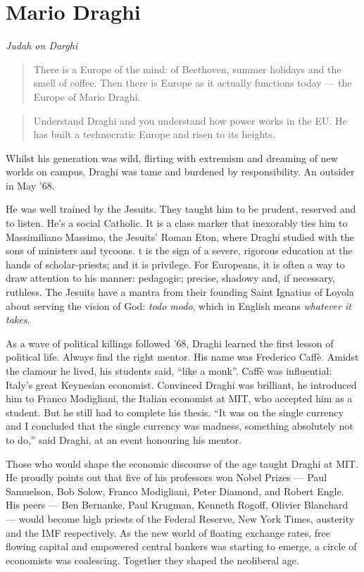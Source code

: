 \documentclass[
]{book}
\begin{document}
\hypertarget{mario-draghi}{%
\section{Mario Draghi}\label{mario-draghi}}

\emph{Judah on Darghi}

\begin{quote}
There is a Europe of the mind: of Beethoven, summer holidays and the smell of coffee.
Then there is Europe as it actually functions today --- the Europe of Mario Draghi.
\end{quote}

\begin{quote}
Understand Draghi and you understand how power works in the EU. He has built a
technocratic Europe and risen to its heights.
\end{quote}

Whilst his generation was wild, flirting with extremism and dreaming of new worlds on
campus, Draghi was tame and burdened by responsibility. An outsider in May '68.

He was well trained by the Jesuits.
They taught him to be prudent, reserved and to listen. He's a social Catholic.
It is a class marker that inexorably ties him to Massimiliano Massimo, the Jesuits'
Roman Eton, where Draghi studied with the sons of ministers and tycoons.
t is the sign of a severe, rigorous education at the hands of scholar-priests; and it
is privilege. For Europeans, it is often a way to draw attention to his manner:
pedagogic; precise, shadowy and, if necessary, ruthless.
The Jesuits have a mantra from their founding Saint Ignatius of Loyola about serving
the vision of God: \emph{todo modo}, which in English means \emph{whatever it takes}.

As a wave of political killings followed '68, Draghi learned the first lesson of
political life. Always find the right mentor. His name was Frederico Caffè.
Amidst the clamour he lived, his students said, ``like a monk''.
Caffè was influential: Italy's great Keynesian economist.
Convinced Draghi was brilliant, he introduced him to Franco Modigliani,
the Italian economist at MIT, who accepted him as a student.
But he still had to complete his thesis.
``It was on the single currency and I concluded that the single currency was madness,
something absolutely not to do,'' said Draghi, at an event honouring his mentor.

Those who would shape the economic discourse of the age taught Draghi at MIT.
He proudly points out that five of his professors won Nobel Prizes ---
Paul Samuelson, Bob Solow, Franco Modigliani, Peter Diamond, and Robert Engle.
His peers --- Ben Bernanke, Paul Krugman, Kenneth Rogoff, Olivier Blanchard ---
would become high priests of the Federal Reserve, New York Times, austerity and the IMF
respectively.
As the new world of floating exchange rates, free flowing capital and empowered
central bankers was starting to emerge, a circle of economists was coalescing.
Together they shaped the neoliberal age.
\end{document}
